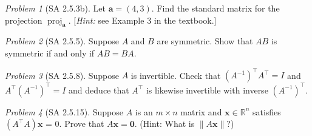 \documentclass[fleqn,11pt]{paper}
\theoremstyle{remark}
\newtheorem{problem}{Problem}
\newcommand\R{\fld{R}}
\newcommand\proj{\ensuremath{\operatorname{proj}}}
\renewcommand{\vec}[1]{\mathbf{#1}}
\newcommand{\<}{\ensuremath{\langle}}
\renewcommand{\>}{\ensuremath{\rangle}}
\newcommand\fld[1]{\ensuremath{\mathbb{#1}}}
\newcommand\va{\vec{a}}
\newcommand\vx{\vec{x}}
\newcommand\vzero{\vec{0}}
\begin{document}
\probskip

\begin{problem}[SA 2.5.3b]
Let $\va =(4, 3)$. Find the standard matrix for the projection $\proj_{\va}$.
[{\it Hint:} see Example 3 in the textbook.]
\end{problem}

\probskip

\begin{problem}[SA 2.5.5]
  Suppose $A$ and $B$ are symmetric.  Show that $AB$ is symmetric if and only if
  $AB = BA$.
\end{problem}

\probskip

\begin{problem}[SA 2.5.8]
  Suppose $A$ is invertible.  Check that $(A^{-1})^{\top}A^\top = I$ and
  $A^\top (A^{-1})^\top = I$ and deduce that $A^\top$ is likewise invertible with
  inverse $(A^{-1})^\top$.
\end{problem}

\probskip
\begin{problem}[SA 2.5.15]
Suppose $A$ is an $m \times n$ matrix and $\vx \in \R^n$ satisfies $(A^\top A)\vx$ = 0. 
Prove that $A\vx = \vzero$. (Hint: What is $\|A\vx\|$?)
\end{problem}
\end{document}
